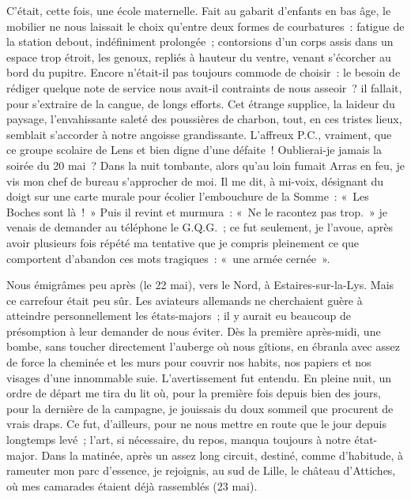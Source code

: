 \documentclass[french,twoside]{book} %
\begin{document}
C’était, cette fois, une école maternelle. Fait au gabarit d’enfants en bas âge, le mobilier ne nous laissait le choix qu’entre deux formes de courbatures : fatigue de la station debout, indéfiniment prolongée ; contorsions d’un corps assis dans un espace trop étroit, les genoux, repliés à hauteur du ventre, venant s’écorcher au bord du pupitre. Encore n’était-il pas toujours commode de choisir : le besoin de rédiger quelque note de service nous avait-il contraints de nous asseoir ? il fallait, pour s’extraire de la cangue, de longs efforts. Cet étrange supplice, la laideur du paysage, l’envahissante saleté des poussières de charbon, tout, en ces tristes lieux, semblait s’accorder à notre angoisse grandissante. L’affreux P.C., vraiment, que ce groupe scolaire de Lens et bien digne d’une défaite ! Oublierai-je jamais la soirée du 20 mai ? Dans la nuit tombante, alors qu’au loin fumait Arras en feu, je vis mon chef de bureau s’approcher de moi. Il me dit, à mi-voix, désignant du doigt sur une carte murale pour écolier l’embouchure de la Somme : « Les Boches   sont là ! » Puis il revint et murmura : « Ne le racontez pas trop. » je venais de demander au téléphone le G.Q.G. ; ce fut seulement, je l’avoue, après avoir plusieurs fois répété ma tentative que je compris pleinement ce que comportent d’abandon ces mots tragiques : « une armée cernée ».\par
Nous émigrâmes peu après (le 22 mai), vers le Nord, à Estaires-sur-la-Lys. Mais ce carrefour était peu sûr. Les aviateurs allemands ne cherchaient guère à atteindre personnellement les états-majors ; il y aurait eu beaucoup de présomption à leur demander de nous éviter. Dès la première après-midi, une bombe, sans toucher directement l’auberge où nous gîtions, en ébranla avec assez de force la cheminée et les murs pour couvrir nos habits, nos papiers et nos visages d’une innommable suie. L’avertissement fut entendu. En pleine nuit, un ordre de départ me tira du lit où, pour la première fois depuis bien des jours, pour la dernière de la campagne, je jouissais du doux sommeil que procurent de vrais draps. Ce fut, d’ailleurs, pour ne nous mettre en route que le jour depuis longtemps levé ; l’art, si nécessaire, du repos, manqua toujours à notre état-major. Dans la matinée, après un assez long circuit, destiné, comme d’habitude, à rameuter mon parc d’essence, je rejoignis, au sud de Lille, le château d’Attiches, où mes camarades étaient déjà rassemblés (23 mai).\par
\end{document}
